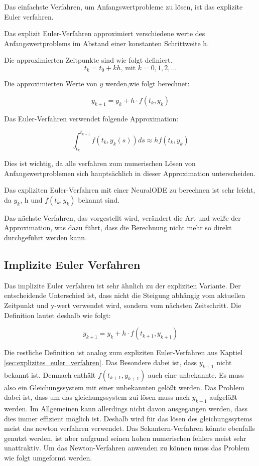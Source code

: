 
Das einfachste Verfahren, um Anfangswertprobleme zu lösen, ist das explizite Euler verfahren.

Das explizit Euler-Verfahren approximiert verschiedene werte des Anfangswertproblems 
im Abstand einer konstanten Schrittweite h.

Die approximierten Zeitpunkte sind wie folgt definiert.
$$
t_k = t_0 + kh \text{, mit } k = 0, 1, 2, ...
$$

Die approximierten Werte von $y$ werden,wie folgt berechnet:

$$
y_{k + 1} = y_{k} + h \cdot f(t_k, y_k)
$$

Das Euler-Verfahren verwendet folgende Approximation:

$$
\int_{t_k}^{t_{k+1}} f(t_k, y_k(s)) ds \approx h f(t_k, y_k)
$$

Dies ist wichtig, da alle verfahren zum numerischen Lösen von Anfangswertproblemen sich hauptsächlich in dieser Approximation unterscheiden.

Das expliziten Euler-Verfahren mit einer NeuralODE  zu berechnen
ist sehr leicht, da $y_k$, h und $f(t_k, y_k)$ bekannt sind.

Das nächste Verfahren, das vorgestellt wird, verändert die Art und weiße der Approximation, was dazu führt, dass die Berechnung nicht mehr so direkt durchgeführt werden kann.

\subsection{Implizite Euler Verfahren}

Das implizite Euler verfahren ist sehr ähnlich zu der expliziten Variante.
Der entscheidende Unterschied ist, dass nicht die Steigung abhängig vom aktuellen 
Zeitpunkt und y-wert verwendet wird, sondern vom nächsten Zeitschritt.
Die Definition lautet deshalb wie folgt:

$$
y_{k + 1} = y_k + h \cdot f(t_{k + 1}, y_{k + 1})
$$

Die restliche Definition ist analog zum expliziten Euler-Verfahren aus Kaptiel \ref{sec:explizites_euler_verfahren}.
Das Besondere dabei ist, dass $y_{k + 1}$ nicht bekannt ist.
Demnach enthält $f(t_{k + 1}, y_{k + 1})$ auch eine unbekannte.
Es muss also ein Gleichungssystem mit einer unbekannten gelößt werden.
Das Problem dabei ist, dass um das gleichungssystem zui lösen muss nach $y_{k + 1}$ aufgelößt werden.
Im Allgemeinen kann allerdings nicht davon ausgegangen werden, dass dies immer effizient möglich ist.
Deshalb wird für das lösen des gleichungssytems meist das newton verfahren verwendet.
Das Sekantern-Verfahren könnte ebenfalls genutzt werden, ist aber aufgrund seinen hohen numerischen 
fehlers meist sehr unattraktiv.
Um das Newton-Verfahren anwenden zu können muss das Problem wie folgt umgeformt werden.

